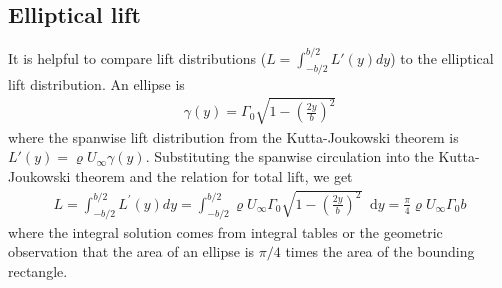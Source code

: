\documentclass[10pt]{article}
\newcommand{\diff}{\mathop{}\!\tn{d}} %
\newcommand{\pp}[2]{\frac{\partial #1}{\partial #2}}
\newcommand{\mb}[1]{\boldsymbol{\mathbf{#1}}} %
\newcommand{\mbf}[1]{\mathbf{#1}}
\newcommand{\mcal}[1]{\mathcal{#1}} %
\newcommand{\be}{\begin{eqnarray}}
\newcommand{\ee}{\end{eqnarray}}
\newcommand{\beq}{\begin{equation}\begin{aligned}}
\newcommand{\eeq}{\end{aligned}\end{equation}}
\newcommand{\Uinf}{U_{\infty}}
\newcommand{\tn}[1]{\textrm{#1}}
\begin{document}






\subsection{Elliptical lift}

It is helpful to compare lift distributions ($L = \int_{-b/2}^{b/2}L'(y) dy$) to the elliptical lift distribution.
An ellipse is
\be
\gamma(y)=\Gamma_0 \sqrt{1-\left(\frac{2 y}{b}\right)^2}
\ee
where the spanwise lift distribution from the Kutta-Joukowski theorem is $L'(y) = \varrho \Uinf \gamma(y)$.
Substituting the spanwise circulation into the Kutta-Joukowski theorem and the relation for total lift, we get
\be
L=\int_{-b / 2}^{b / 2} L^{\prime}(y) d y=\int_{-b / 2}^{b / 2} \varrho \Uinf \Gamma_0 \sqrt{1-\left(\frac{2 y}{b}\right)^2} \diff y=\frac{\pi}{4} \varrho \Uinf \Gamma_0 b
\ee
where the integral solution comes from integral tables or the geometric observation that the area of an ellipse is $\pi/4$ times the area of the bounding rectangle.
\end{document}
